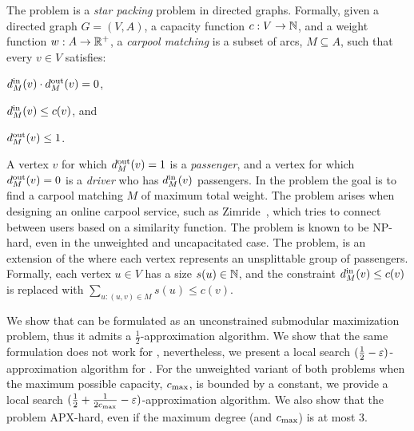 
The \carpool problem is a \emph{star packing} problem in directed
graphs.  Formally, given a directed graph $G = (V, A)$, a capacity
function $c: V \rightarrow \N$, and a weight function $w:
A \rightarrow \R^+$, a \emph{carpool matching} is a subset of arcs,
$M \subseteq A$, such that every $v \in V$ satisfies:%
\begin{inparaenum}[(i)]
\item $\din[M](v) \cdot \dout[M](v) = 0$,
\item $\din[M](v) \leq c(v)$, and 
\item $\dout[M](v) \leq 1$.
\end{inparaenum}
A vertex $v$ for which $\dout[M](v) = 1$ is a \emph{passenger}, and a
vertex for which $\dout[M](v) = 0$ is a \emph{driver} who has
$\din[M](v)$ passengers.  In the \carpool problem the goal is to find
a carpool matching $M$ of maximum total weight.
%
The problem arises when designing an online carpool service, such as
Zimride~\cite{zimride}, which tries to connect between users based on
a similarity function.  The problem is known to be NP-hard, even in
the unweighted and uncapacitated case.
%
The \gcp problem, is an extension of the \carpool where each vertex
represents an unsplittable group of passengers.  Formally, each vertex
$u \in V$ has a size $s(u) \in \N$, and the constraint $\din(v) \leq
c(v)$ is replaced with $\sum_{u:(u,v) \in M} s(u) \leq c(v)$.

We show that \carpool can be formulated as an unconstrained submodular
maximization problem, thus it admits a $\frac{1}{2}$-approximation
algorithm.  We show that the same formulation does not work for \gcp,
nevertheless, we present a local search $(\frac{1}{2}
- \eps)$-approximation algorithm for \gcp.
%
For the unweighted variant of both problems when the maximum possible
capacity, $\cmax$, is bounded by a constant, we provide a local search
$(\half + \inv{2\cmax} - \eps)$-approximation algorithm.  We also show
that the problem APX-hard, even if the maximum degree (and $\cmax$) is
at most $3$.

